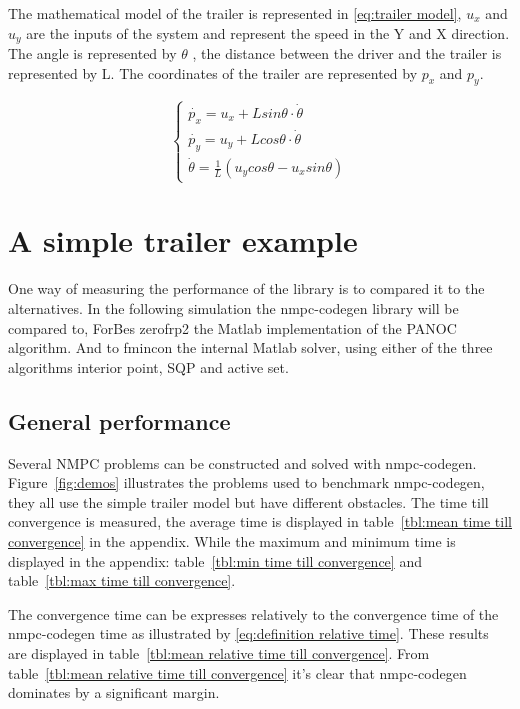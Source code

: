The mathematical model of the trailer is represented in \eqref{eq:trailer model}, $u_x$ and $u_y$ are the inputs of the system and represent the speed in the Y and X direction. The angle is represented by $\theta$ , the distance between the driver and the trailer is represented by L. The coordinates of the trailer are represented by $p_x$ and $p_y$.

\begin{equation}
	\begin{cases}
		\dot{p_x} = u_x + L sin \theta \cdot \dot{\theta} \\
		\dot{p_y} = u_y + L cos \theta \cdot \dot{\theta} \\
		\dot{\theta} = \frac{1}{L}(u_ycos \theta - u_x sin \theta)	
	\end{cases}
	\label{eq:trailer model}
\end{equation}

\section{A simple trailer example}
One way of measuring the performance of the library is to compared it to the alternatives. In the following simulation the nmpc-codegen library will be compared to, ForBes zerofrp2 the Matlab implementation of the PANOC algorithm. And to fmincon the internal Matlab solver, using either of the three algorithms interior point, SQP and active set.

\subsection{General performance}
Several NMPC problems can be constructed and solved with nmpc-codegen. Figure~\ref{fig:demos} illustrates the problems used to benchmark nmpc-codegen, they all use the simple trailer model but have different obstacles. The time till convergence is measured, the average time is displayed in table~\ref{tbl:mean time till convergence} in the appendix. While the maximum and minimum time is displayed in the appendix: table~\ref{tbl:min time till convergence} and table~\ref{tbl:max time till convergence}.

The convergence time can be expresses relatively to the convergence time of the nmpc-codegen time as illustrated by \eqref{eq:definition relative time}. These results are displayed in table~\ref{tbl:mean relative time till convergence}. From table~\ref{tbl:mean relative time till convergence} it's clear that nmpc-codegen dominates by a significant margin.

